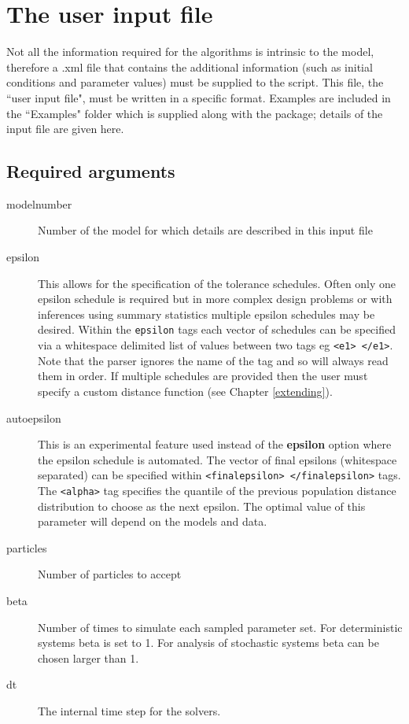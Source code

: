 \documentclass[a4paper]{report}
\begin{document}
\section{The user input file}
Not all the information required for the algorithms is intrinsic to the model, therefore a .xml file that contains the additional information (such as initial conditions and parameter values) must be supplied to the script. This file,  the ``user input file", must be written in a specific format. Examples are included in the ``Examples" folder which is supplied along with the package; details of the input file are given here.

\subsection{Required arguments}
\begin{description}
	\item[modelnumber] Number of the model for which details are described in this input file
	\item[epsilon] This allows for the specification of the tolerance schedules. Often only one epsilon schedule is required but in more complex design problems or with inferences using summary statistics multiple epsilon schedules may be desired. Within the \verb$epsilon$ tags each vector of schedules can be specified via a whitespace delimited list of values between two tags eg \verb$<e1> </e1>$. Note that the parser ignores the name of the tag and so will always read them in order. If multiple schedules are provided then the user must specify a custom distance function (see Chapter \ref{extending}).
	\item[autoepsilon] This is an experimental feature used instead of the {\bf epsilon} option where the epsilon schedule is automated. The vector of final epsilons (whitespace separated) can be specified within \verb$<finalepsilon> </finalepsilon>$ tags. The \verb$<alpha>$ tag specifies the quantile of the previous population distance distribution to choose as the next epsilon. The optimal value of this parameter will depend on the models and data.
	\item[particles] Number of particles to accept
	\item[beta] Number of times to simulate each sampled parameter set. For deterministic systems beta is set to 1. For analysis of stochastic systems beta can be chosen larger than 1.
	\item[dt] The internal time step for the solvers.


\end{description}
\end{document}
